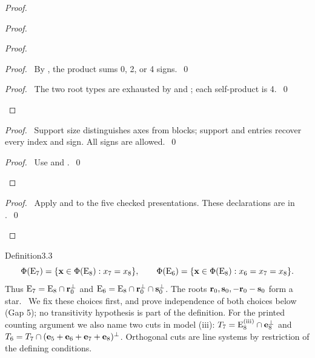 \begin{proof}
\begin{proof}
\begin{proof}
   \begin{proof}\pf\ By , the product sums 0, 2, or 4 signs.~\qed\end{proof}
   \qedstep
   \begin{proof}\pf\ The two root types are exhausted by 
    and ; each self-product is 4.~\qed\end{proof}
  \end{proof}
  \begin{proof}\pf\ Support size distinguishes axes from blocks; support and entries
   recover every index and sign. All signs are allowed.~\qed\end{proof}
  \qedstep
  \begin{proof}\pf\ Use  and .~\qed\end{proof}
 \end{proof}
 \qedstep
 \begin{proof}\pf\ Apply  and
   to the five checked presentations.
  These declarations are in .~\qed\end{proof}
\end{proof}

\begin{cgss}{Definition}{3.3}\label{def:3.3}
 \[
 \Phi(\mathrm{E}_7)=\{{\mathbf x}\in\Phi(\mathrm{E}_8):x_7=x_8\},\qquad
 \Phi(\mathrm{E}_6)=\{{\mathbf x}\in\Phi(\mathrm{E}_8):x_6=x_7=x_8\}.
 \]
 Thus $\mathrm{E}_7=\mathrm{E}_8\cap{\mathbf r}_0^\perp$ and
 $\mathrm{E}_6=\mathrm{E}_8\cap{\mathbf r}_0^\perp\cap{\mathbf s}_0^\perp$.
 The roots ${\mathbf r}_0,{\mathbf s}_0,-{\mathbf r}_0-{\mathbf s}_0$ form a star.
 \repair\ We fix these choices first, and prove independence of both choices below
 (Gap 5); no transitivity hypothesis is part of the definition.
 For the printed counting argument we also name two cuts in model (iii):
 $T_7=\mathrm{E}_8^{\rm(iii)}\cap{\mathbf e}_8^\perp$ and
 $T_6=T_7\cap({\mathbf e}_5+{\mathbf e}_6+{\mathbf e}_7+{\mathbf e}_8)^\perp$.
 Orthogonal cuts are line systems by restriction of the defining conditions.
\end{cgss}

